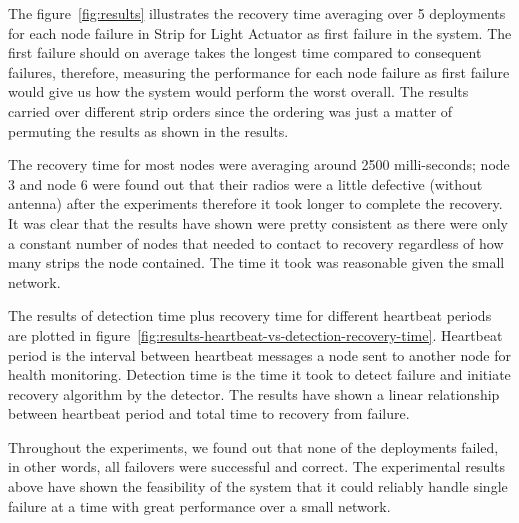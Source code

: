 The figure~\ref{fig:results} illustrates the recovery time averaging over
5 deployments for each node failure in Strip for Light Actuator as first failure
in the system. The first failure should on average takes the longest time
compared to consequent failures, therefore, measuring the performance for each
node failure as first failure would give us how the system would perform the
worst overall. The results carried over different strip orders since the
ordering was just a matter of permuting the results as shown in the results.

The recovery time for most nodes were averaging around 2500 milli-seconds; node
3 and node 6 were found out that their radios were a little defective (without
antenna) after the experiments therefore it took longer to complete the
recovery. It was clear that the results have shown were pretty consistent as
there were only a constant number of nodes that needed to contact to recovery
regardless of how many strips the node contained. The time it took was
reasonable given the small network. 

The results of detection time plus recovery time for different heartbeat
periods are plotted
in figure~\ref{fig:results-heartbeat-vs-detection-recovery-time}. Heartbeat
period is the interval between heartbeat messages a node sent to
another node for health monitoring. Detection time is the time it took to detect
failure and initiate recovery algorithm by the detector.
The results have shown a linear relationship between heartbeat
period and total time to recovery from failure. 

Throughout the experiments, we found out that none of the deployments failed, in
other words, all failovers were successful and correct. The experimental results
above have shown the feasibility of the system that it could reliably handle
single failure at a time with great performance over a small network.





